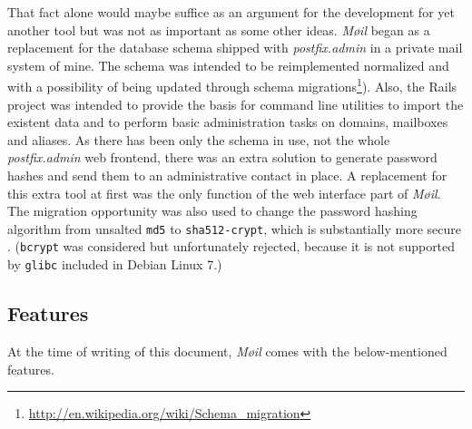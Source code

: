 \documentclass[12pt,a4paper]{scrartcl}
\begin{document}
		That fact alone would maybe suffice as an argument for the development
		for yet another tool but was not as important as some other ideas.
		\emph{Møil} began as a replacement for the database schema shipped with
		\emph{postfix.admin} in a private mail system of mine. The schema
		was intended to be reimplemented normalized \cite{dbnorm} and with
		a possibility of being updated through schema
		migrations\footnote{\url{http://en.wikipedia.org/wiki/Schema_migration}}).
		Also, the \ac{Rails} project was intended to provide the basis for
		command line utilities to import the existent data and to perform basic
		administration tasks on domains, mailboxes and aliases. As there has
		been only the schema in use, not the whole \emph{postfix.admin} web
		frontend, there was an extra solution to generate password hashes and
		send them to an administrative contact in place. A replacement for this
		extra tool at first was the only function of the web interface part of
		\emph{Møil}. The migration opportunity was also used to change the
		password hashing algorithm from unsalted \texttt{md5} to
		\texttt{sha512-crypt}, which is substantially more secure
		\cite{missing}. (\texttt{bcrypt} was considered but unfortunately
		rejected, because it is not supported by \texttt{glibc} included in
		Debian Linux 7.)



		\label{sec:moeil:features}
		\subsection*{Features}
			At the time of writing of this document, \emph{Møil} comes with the
			below-mentioned features.
\end{document}
